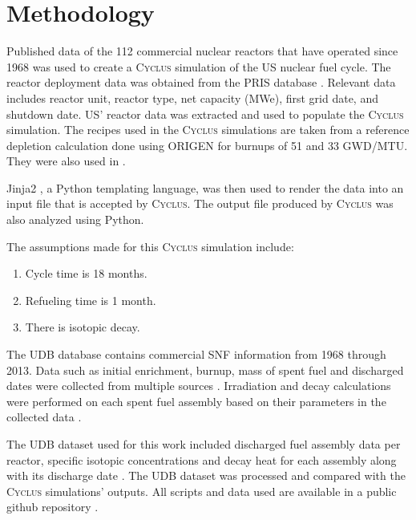 \documentclass{anstrans}
\newcommand{\Cyclus}{\textsc{Cyclus}\xspace}%
\begin{document}
\section{Methodology}
Published data of the 112 commercial nuclear reactors that have operated since 
1968 was used to create a \Cyclus simulation of the \gls{US} 
nuclear fuel cycle. The reactor deployment data was obtained from the \gls{PRIS} 
database \cite{IAEA_pris_2017}.  Relevant data includes 
reactor unit, reactor type, net capacity (MWe), first grid date, and shutdown 
date. \gls{US}' reactor data was extracted and used to populate the \Cyclus 
simulation. The recipes used in the \Cyclus simulations are taken from a 
reference depletion calculation done using ORIGEN \cite{bell_origen_1973} for 
burnups of 51 and 33 GWD/MTU. They were also used in 
\cite{wilson_adoption_2009, bae_synergistic_2017}. 

Jinja2 \cite{ronacher_welcome_2018}, a Python templating language, was then 
used to render the data into an input file that is accepted by 
\Cyclus. The output file produced by \Cyclus was also analyzed using Python. 

The assumptions made for this \Cyclus simulation include: 

\begin{enumerate}[topsep=0pt,itemsep=-1ex,partopsep=1ex,parsep=1ex]
	\item Cycle time is 18 months. 
	\item Refueling time is 1 month. 
	\item There is isotopic decay. 
\end{enumerate}

The \gls{UDB} database contains commercial \gls{SNF} information from 1968 through 2013. 
Data such as initial enrichment, burnup, mass of spent fuel and discharged 
dates were collected from multiple sources \cite{peterson_additional_2017}. 
Irradiation and decay calculations were performed on each spent fuel assembly based on their parameters
in the collected data \cite{peterson_additional_2017}.

The \gls{UDB} dataset used for this work included discharged fuel assembly data per 
reactor, specific isotopic concentrations and decay heat for each assembly 
along with its discharge date \cite{peterson_unf-st&dards_2017}. The \gls{UDB} 
dataset was processed and compared with the \Cyclus 
simulations' outputs. All scripts and data used are available in a public github repository
\cite{chee_arfc/transition-scenarios_2018}. 
\end{document}
